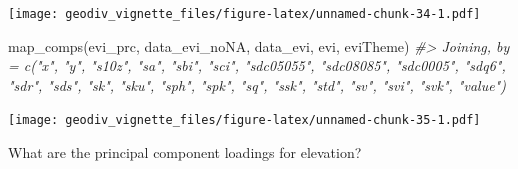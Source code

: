 \documentclass[
]{article}
\newenvironment{Shaded}{\begin{snugshade}}{\end{snugshade}}
\newcommand{\CommentTok}[1]{\textcolor[rgb]{0.56,0.35,0.01}{\textit{#1}}}
\newcommand{\FunctionTok}[1]{\textcolor[rgb]{0.00,0.00,0.00}{#1}}
\newcommand{\NormalTok}[1]{#1}
\begin{document}
\texttt{[image: geodiv\_vignette\_files/figure-latex/unnamed-chunk-34-1.pdf]}

\begin{Shaded}
\begin{Highlighting}[]
\FunctionTok{map\_comps}\NormalTok{(evi\_prc, data\_evi\_noNA, data\_evi, evi, eviTheme)}
\CommentTok{\#\textgreater{} Joining, by = c("x", "y", "s10z", "sa", "sbi", "sci", "sdc05055", "sdc08085", "sdc0005", "sdq6", "sdr", "sds", "sk", "sku", "sph", "spk", "sq", "ssk", "std", "sv", "svi", "svk", "value")}
\end{Highlighting}
\end{Shaded}

\texttt{[image: geodiv\_vignette\_files/figure-latex/unnamed-chunk-35-1.pdf]}

What are the principal component loadings for elevation?
\end{document}
